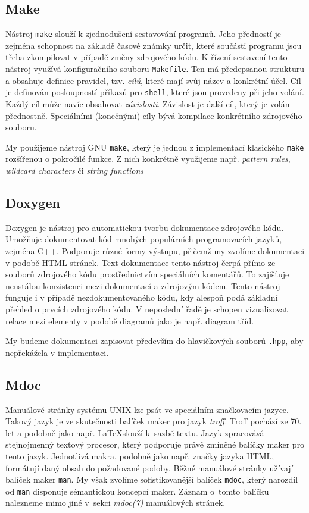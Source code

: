 \documentclass[thesis=B,czech,hidelinks]{thesis}[2012/06/26]
\begin{document}
\subsection{Make}

Nástroj \texttt{make} slouží k zjednodušení sestavování programů. Jeho předností je zejména schopnost na základě časové známky určit, které součásti programu jsou třeba zkompilovat v případě změny zdrojového kódu. K řízení sestavení tento nástroj využívá konfiguračního souboru \texttt{Makefile}. Ten má předepsanou strukturu a obsahuje definice pravidel, tzv. \emph{cílů}, které mají svůj název a konkrétní účel. Cíl je definován posloupností příkazů pro \texttt{shell}, které jsou provedeny při jeho volání. Každý cíl může navíc obsahovat \emph{závislosti}. Závislost je další cíl, který je volán přednostně. Speciálními (konečnými) cíly bývá kompilace konkrétního zdrojového souboru\cite{gmake}.

My použijeme nástroj GNU \texttt{make}, který je jednou z implementací klasického \texttt{make} rozšířenou o pokročilé funkce. Z nich konkrétně využijeme např. \emph{pattern rules}, \emph{wildcard characters} či \emph{string functions}\cite{gmake}

\subsection{Doxygen}

Doxygen je nástroj pro automatickou tvorbu dokumentace zdrojového kódu. Umožňuje dokumentovat kód mnohých populárních programovacích jazyků, zejména C++. Podporuje různé formy výstupu, přičemž my zvolíme dokumentaci v podobě HTML stránek. Text dokumentace tento nástroj čerpá přímo ze souborů zdrojového kódu prostřednictvím speciálních komentářů. To zajišťuje neustálou konzistenci mezi dokumentací a zdrojovým kódem. Tento nástroj funguje i v případě nezdokumentovaného kódu, kdy alespoň podá základní přehled o prvcích zdrojového kódu. V neposlední řadě je schopen vizualizovat relace mezi elementy v podobě diagramů jako je např. diagram tříd\cite{doxygen}.

My budeme dokumentaci zapisovat především do hlavičkových souborů \texttt{.hpp}, aby nepřekážela v implementaci.

\subsection{Mdoc}

Manuálové stránky systému UNIX lze psát ve speciálním značkovacím jazyce. Takový jazyk je ve skutečnosti balíček maker pro jazyk \emph{troff}. Troff pochází ze 70. let a podobně jako např. \LaTeX slouží k~sazbě textu. Jazyk zpracovává stejnojmenný textový procesor, který podporuje právě zmíněné balíčky maker pro tento jazyk. Jednotlivá makra, podobně jako např. značky jazyka HTML, formátují daný obsah do požadované podoby\cite{troff}. Běžné manuálové stránky užívají balíček maker \texttt{man}. My však zvolíme sofistikovanější balíček \texttt{mdoc}, který narozdíl od \texttt{man} disponuje sémantickou koncepcí maker. Záznam o~tomto balíčku nalezneme mimo jiné v~sekci \emph{mdoc(7)} manuálových stránek\cite{mdoc}.
\end{document}
